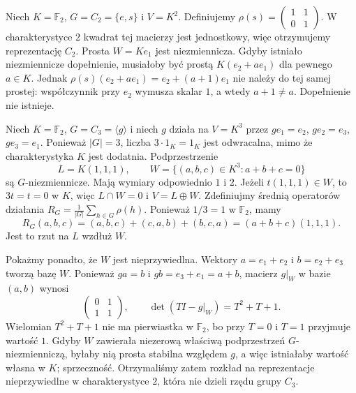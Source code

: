 \begin{przyklad}
\label{aa:prz:maschke-counter}
Niech $K=\mathbb F_2$, $G=C_2=\{e,s\}$ i $V=K^2$.
Definiujemy $\rho(s)=\begin{pmatrix}1&1\\0&1\end{pmatrix}$.
W charakterystyce $2$ kwadrat tej macierzy jest jednostkowy,
więc otrzymujemy reprezentację $C_2$. Prosta $W=Ke_1$
jest niezmiennicza. Gdyby istniało niezmiennicze dopełnienie,
musiałoby być prostą $K(e_2+ae_1)$ dla pewnego $a\in K$.
Jednak $\rho(s)(e_2+ae_1)=e_2+(a+1)e_1$ nie należy do tej
samej prostej: współczynnik przy $e_2$ wymusza skalar $1$,
a wtedy $a+1\ne a$. Dopełnienie nie istnieje.
\end{przyklad}
\begin{przyklad}
\label{aa:prz:maschke-f2-c3}
Niech $K=\mathbb F_2$, $G=C_3=\langle g\rangle$ i niech
$g$ działa na $V=K^3$ przez $g e_1=e_2$, $g e_2=e_3$,
$g e_3=e_1$. Ponieważ $|G|=3$, liczba $3\cdot1_K=1_K$
jest odwracalna, mimo że charakterystyka $K$ jest dodatnia.
Podprzestrzenie
\[
L=K(1,1,1),\qquad
W=\{(a,b,c)\in K^3:a+b+c=0\}
\]
są $G$-niezmiennicze. Mają wymiary odpowiednio $1$ i $2$.
Jeżeli $t(1,1,1)\in W$, to $3t=t=0$ w $K$,
więc $L\cap W=0$ i $V=L\oplus W$.
Zdefiniujmy średnią operatorów działania
$R_G=\frac1{|G|}\sum_{h\in G}\rho(h)$. Ponieważ
$1/3=1$ w $\mathbb F_2$, mamy
\[
R_G(a,b,c)=(a,b,c)+(c,a,b)+(b,c,a)
=(a+b+c)(1,1,1).
\]
Jest to rzut na $L$ wzdłuż $W$.

Pokażmy ponadto, że $W$ jest nieprzywiedlna. Wektory
$a=e_1+e_2$ i $b=e_2+e_3$ tworzą bazę $W$.
Ponieważ $g a=b$ i $g b=e_3+e_1=a+b$, macierz
$g|_W$ w bazie $(a,b)$ wynosi
\[
\begin{pmatrix}0&1\\1&1\end{pmatrix},
\qquad \det(TI-g|_W)=T^2+T+1.
\]
Wielomian $T^2+T+1$ nie ma pierwiastka w $\mathbb F_2$,
bo przy $T=0$ i $T=1$ przyjmuje wartość $1$.
Gdyby $W$ zawierała niezerową właściwą podprzestrzeń
$G$-niezmienniczą, byłaby nią prosta stabilna względem $g$,
a więc istniałaby wartość własna w $K$; sprzeczność.
Otrzymaliśmy zatem rozkład na reprezentacje nieprzywiedlne
w charakterystyce $2$, która nie dzieli rzędu grupy $C_3$.
\end{przyklad}

